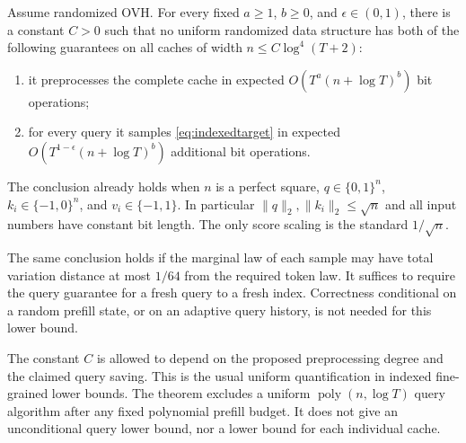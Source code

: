 \begin{theorem}
\label{thm:indexedlower}
Assume randomized OVH.  For every fixed $a\ge1$, $b\ge0$, and
$\epsilon\in(0,1)$, there is a constant $C>0$ such that no uniform
randomized data structure has both of the following guarantees on all
caches of width $n\le C\log^4(T+2)$:
\begin{enumerate}
 \item it preprocesses the complete cache in expected
 $O(T^a(n+\log T)^b)$ bit operations;
 \item for every query it samples \eqref{eq:indexedtarget} in expected
 $O(T^{1-\epsilon}(n+\log T)^b)$ additional bit operations.
\end{enumerate}
The conclusion already holds when $n$ is a perfect square,
$q\in\{0,1\}^n$, $k_i\in\{-1,0\}^n$, and $v_i\in\{-1,1\}$.
In particular $\|q\|_2,\|k_i\|_2\le\sqrt n$ and all input numbers have
constant bit length.  The only score scaling is the standard
$1/\sqrt n$.

The same conclusion holds if the marginal law of each sample may have
total variation distance at most $1/64$ from the required token law.
It suffices to require the query guarantee for a fresh query to a fresh
index.  Correctness conditional on a random prefill state, or on an
adaptive query history, is not needed for this lower bound.
\end{theorem}

The constant $C$ is allowed to depend on the proposed preprocessing
degree and the claimed query saving.  This is the usual uniform
quantification in indexed fine-grained lower bounds.  The theorem
excludes a uniform $\operatorname{poly}(n,\log T)$ query algorithm after
any fixed polynomial prefill budget.  It does not give an unconditional
query lower bound, nor a lower bound for each individual cache.

